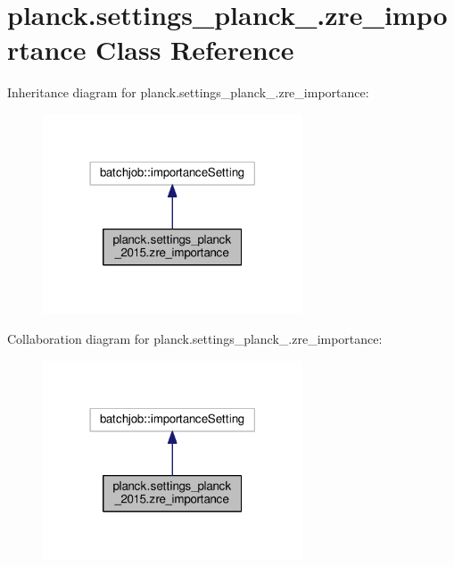 \hypertarget{classplanck_1_1settings__planck__2015_1_1zre__importance}{}\section{planck.\+settings\+\_\+planck\+\_.\+zre\+\_\+importance Class Reference}
\label{classplanck_1_1settings__planck__2015_1_1zre__importance}


Inheritance diagram for planck.\+settings\+\_\+planck\+\_.\+zre\+\_\+importance\+:
\nopagebreak
\begin{figure}[H]
\begin{center}
\leavevmode
\includegraphics[width=218pt]{classplanck_1_1settings__planck__2015_1_1zre__importance__inherit__graph}
\end{center}
\end{figure}


Collaboration diagram for planck.\+settings\+\_\+planck\+\_.\+zre\+\_\+importance\+:
\nopagebreak
\begin{figure}[H]
\begin{center}
\leavevmode
\includegraphics[width=218pt]{classplanck_1_1settings__planck__2015_1_1zre__importance__coll__graph}
\end{center}
\end{figure}
